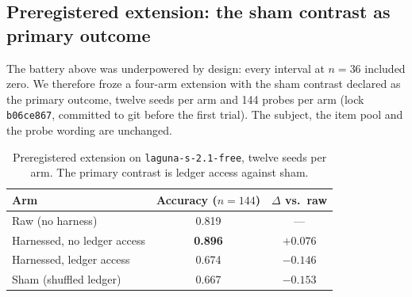 %
%

\subsection{Preregistered extension: the sham contrast as primary outcome}
\label{sec:n12}

The battery above was underpowered by design: every interval at $n=36$
included zero. We therefore froze a four-arm extension with the sham
contrast declared as the primary outcome, twelve seeds per arm and 144
probes per arm (lock \texttt{b06ce867}, committed to git before the first
trial). The subject, the item pool and the probe wording are unchanged.

\begin{table}[h]
\centering
\begin{tabular}{lcc}
\toprule
Arm & Accuracy ($n=144$) & $\Delta$ vs.\ raw \\
\midrule
Raw (no harness)              & 0.819 & --- \\
Harnessed, no ledger access   & \textbf{0.896} & $+0.076$ \\
Harnessed, ledger access      & 0.674 & $-0.146$ \\
Sham (shuffled ledger)        & 0.667 & $-0.153$ \\
\bottomrule
\end{tabular}
\caption{Preregistered extension on \texttt{laguna-s-2.1-free}, twelve seeds
per arm. The primary contrast is ledger access against sham.}
\label{tab:n12}
\end{table}


